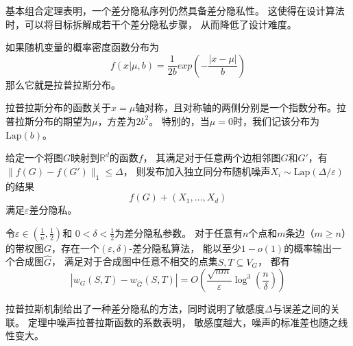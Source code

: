 基本组合定理表明，一个差分隐私序列仍然具备差分隐私性。
这使得在设计算法时，可以将目标拆解成若干个差分隐私步骤，
从而降低了设计难度。

\begin{definition}[拉普拉斯分布]
    如果随机变量的概率密度函数分布为
    \begin{equation*}
        f(x|\mu,b)=\frac 1{2b} exp\left(-\frac{|x-\mu|}b\right)
    \end{equation*}
    那么它就是拉普拉斯分布。
\end{definition}

拉普拉斯分布的函数关于$x=\mu$轴对称，且对称轴的两侧分别是一个指数分布。拉普拉斯分布的期望为$\mu$，方差为$2b^2$。
特别的，当$\mu=0$时，我们记该分布为$\text{Lap}(b)$。

\begin{theorem}[拉普拉斯机制]\cite{dwork2014algorithmic}
    \label{laplace}
    给定一个将图$G$映射到$\mathbb{R}^d$的函数$f$，
    其满足对于任意两个边相邻图$G$和$G'$，有$\|f(G)-f(G')\|_1 \leq \Delta$，
    则发布加入独立同分布随机噪声$X_i \sim \text{Lap} (\Delta/\varepsilon)$的结果
    \begin{equation*}
        f(G)+(X_1,\ldots,X_d)
    \end{equation*}
    满足$\varepsilon$差分隐私。
\end{theorem}

\begin{theorem}[差分隐私图]\cite{liu2024optimal}
    \label{the:dpgraph}
    令$\varepsilon \in \left(\frac{1}{n}, \frac{1}{2}\right) $和 
    $ 0 < \delta < \frac{1}{2} $为差分隐私参数。
    对于任意有$n$个点和$m$条边（$m\geq n$）的带权图$G$，存在一个$(\varepsilon,\delta)$-差分隐私算法，
    能以至少$ 1 - o(1) $的概率输出一个合成图$\hat G$，
    满足对于合成图中任意不相交的点集$ S, T \subseteq V_G $，
    都有
    \begin{equation*}
        |w_G(S, T) - w_{\hat{G}}(S, T)| = O\left(\frac{\sqrt{nm}}{\varepsilon} \log^3 \left(\frac{n}{\delta}\right)\right)   
    \end{equation*}
    
\end{theorem}

拉普拉斯机制给出了一种差分隐私的方法，同时说明了敏感度$\Delta$与误差之间的关联。
定理中噪声拉普拉斯函数的系数表明，
敏感度越大，噪声的标准差也随之线性变大。


